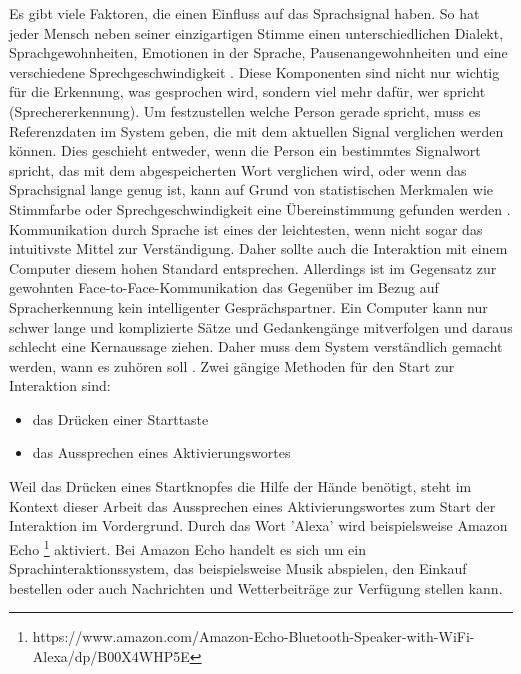 \newline \newline
Es gibt viele Faktoren, die einen Einfluss auf das Sprachsignal haben. So hat jeder Mensch neben seiner einzigartigen Stimme einen unterschiedlichen Dialekt, Sprachgewohnheiten, Emotionen in der Sprache, Pausenangewohnheiten und eine verschiedene Sprechgeschwindigkeit \cite{KaufmannPfisterSprache}. Diese Komponenten sind nicht nur wichtig für die Erkennung, was gesprochen wird, sondern viel mehr dafür, wer spricht (Sprechererkennung).
\newline \newline
Um festzustellen welche Person gerade spricht, muss es Referenzdaten im System geben, die mit dem aktuellen Signal verglichen werden können. Dies geschieht entweder, wenn die Person ein bestimmtes Signalwort spricht, das mit dem abgespeicherten Wort verglichen wird, oder wenn das Sprachsignal lange genug ist, kann auf Grund von statistischen Merkmalen wie \zB Stimmfarbe oder Sprechgeschwindigkeit eine Übereinstimmung gefunden werden \cite{KaufmannPfisterSprache}. 
\newline \newline
Kommunikation durch Sprache ist eines der leichtesten, wenn nicht sogar das \mbox{intuitivste} Mittel zur Verständigung. Daher sollte auch die Interaktion mit einem Computer diesem hohen Standard entsprechen. Allerdings ist im Gegensatz zur gewohnten Face-to-Face-Kommunikation das Gegenüber im Bezug auf Spracherkennung kein intelligenter Gesprächspartner. Ein Computer kann nur schwer lange und komplizierte Sätze und Gedankengänge mitverfolgen und daraus schlecht eine Kernaussage ziehen. Daher muss dem System verständlich gemacht werden, wann es zuhören soll \cite{SpeechInteraction}.
Zwei gängige \mbox{Methoden} für den Start zur Interaktion sind:
\begin{itemize}
      \item das Drücken einer Starttaste
      \item das Aussprechen eines Aktivierungswortes
\end{itemize}
\vspace{\baselineskip}
Weil das Drücken eines Startknopfes die Hilfe der Hände benötigt, steht im Kontext dieser Arbeit das Aussprechen eines Aktivierungswortes zum Start der Interaktion im Vordergrund. Durch das Wort 'Alexa' wird beispielsweise Amazon Echo%
\footnote{https://www.amazon.com/Amazon-Echo-Bluetooth-Speaker-with-WiFi-Alexa/dp/B00X4WHP5E}
%
aktiviert. Bei Amazon Echo handelt es sich um ein Sprachinteraktionssystem, das beispielsweise Musik abspielen, den Einkauf bestellen oder auch Nachrichten und Wetterbeiträge zur Verfügung stellen kann.
